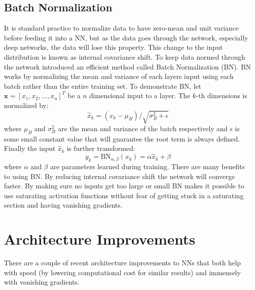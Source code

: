 \subsection{Batch Normalization}
It is standard practice to normalize data to have zero-mean and unit variance before feeding it into a NN, but as the data goes through the network, especially deep networks, the data will lose this property. 
This change to the input distribution is known as internal covariance shift. 
To keep data normed through the network \cite{ioffe2015batch} introduced an efficient method called Batch Normalization (BN). 
BN works by normalizing the mean and variance of each layers input using each batch rather than the entire training set. 
To demonstrate BN, let $\textbf{x} = [x_1,x_2,...,x_n]^T$ be a $n$ dimensional input to a layer. 
The $k$-th dimensions is normalized by:
\begin{equation}
\hat{x}_k = (x_k - \mu_{B})/\sqrt{\sigma^2_B + \epsilon}
\label{eq:BN1}
\end{equation}
where $\mu_{B}$ and $\sigma^2_B$ are the mean and variance of the batch respectively and $\epsilon$ is some small constant value that will guarantee the root term is always defined. 
Finally the input $\hat{x}_k$ is further transformed:
\begin{equation}
y_k = \mbox{BN}_{\alpha,\beta}(x_k) = \alpha \hat{x}_k + \beta
\label{eq:BN2}
\end{equation}
where $\alpha$ and $\beta$ are parameters learned during training. 
There are many benefits to using BN. 
By reducing internal covariance shift the network will converge faster. 
By making sure no inputs get too large or small BN makes it possible to use saturating activation functions without fear of getting stuck in a saturating section and having vanishing gradients.

\section{Architecture Improvements}
There are a couple of recent architecture improvements to NNs that both help with speed (by lowering computational cost for similar results) and immensely with vanishing gradients.

